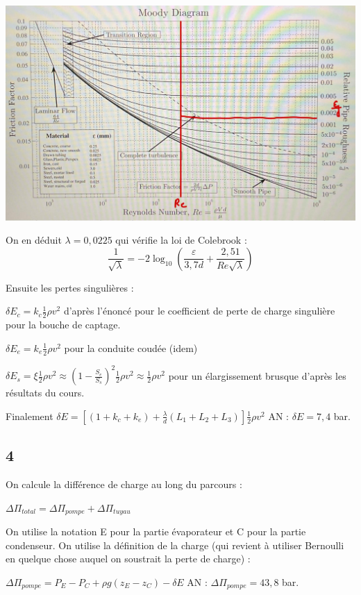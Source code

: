 \documentclass[12pt]{article}
\begin{document}
\includegraphics[scale=0.3]{4 image.jpg}

On en déduit $\lambda=0,0225$ qui vérifie la loi de Colebrook :
$$
\frac{1}{\sqrt{\lambda}} = -2 \log_{10} \left( \frac{\varepsilon}{3{,}7d} + \frac{2{,}51}{Re \sqrt{\lambda}} \right)
$$

Ensuite les pertes singulières :

$\delta E_c = k_c \frac{1}{2} \rho v^2$ d'après l'énoncé pour le coefficient de perte de charge singulière pour la bouche de captage.

$\delta E_e = k_e \frac{1}{2} \rho v^2$ pour la conduite coudée (idem)

$\delta E_s = \xi \frac{1}{2} \rho v^2 \approx (1-\frac{S_e}{S_s})^2 \frac{1}{2} \rho v^2 \approx \frac{1}{2} \rho v^2$ pour un élargissement brusque d'après les résultats du cours.

Finalement $\boxed{\delta E = [(1+k_c+k_e) + \frac{\lambda}{d}(L_1+L_2+L_3)] \frac{1}{2} \rho v^2}$ AN : $\delta E = 7,4$ bar.

\subsection*{4}
On calcule la différence de charge au long du parcours :

$\Delta \Pi_{total} = \Delta \Pi_{pompe} + \Delta \Pi_{tuyau}$

On utilise la notation E pour la partie évaporateur et C pour la partie condenseur.
On utilise la définition de la charge (qui revient à utiliser Bernoulli en quelque chose auquel on soustrait la perte de charge) :

$\boxed{\Delta \Pi_{pompe} = P_E - P_C + \rho g(z_E-z_C) - \delta E}$ AN : $\Delta \Pi_{pompe} = 43,8$ bar.
\end{document}
